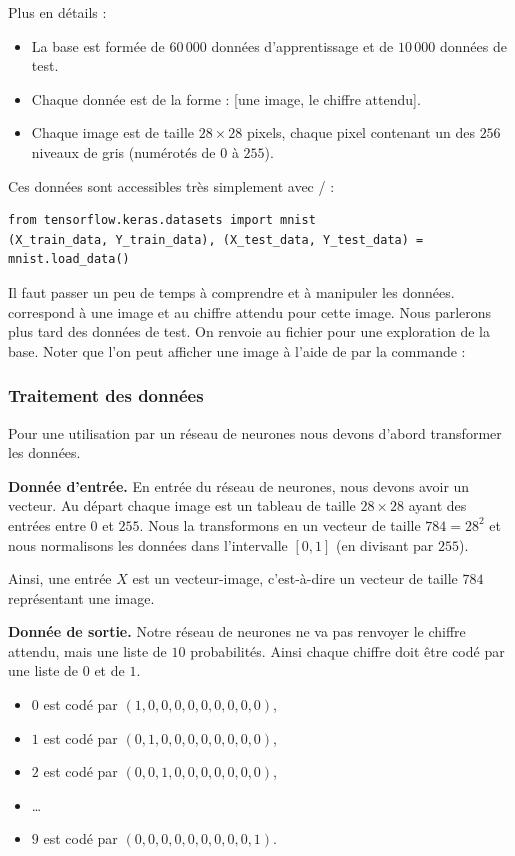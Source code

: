 \documentclass[11pt,class=report,crop=false]{standalone}
\begin{document}
Plus en détails :
\begin{itemize}
  \item La base est formée de $60\,000$ données d'apprentissage et de $10\,000$ données de test.
  \item Chaque donnée est de la forme : [une image, le chiffre attendu].
  \item Chaque image est de taille $28\times28$ pixels, chaque pixel contenant un des $256$ niveaux de gris (numérotés de $0$ à $255$).
\end{itemize}



Ces données sont accessibles très simplement avec \tensorflow/\keras{} :
\begin{lstlisting}
from tensorflow.keras.datasets import mnist
(X_train_data, Y_train_data), (X_test_data, Y_test_data) = mnist.load_data()
\end{lstlisting} 

Il faut passer un peu de temps à comprendre et à manipuler les données.
 correspond à une image et  au chiffre attendu pour cette image. Nous parlerons plus tard des données de test.
On renvoie au fichier  pour une exploration de la base. Noter que l'on peut afficher une image à l'aide de \matplotlib{} par la commande :


\subsubsection*{Traitement des données}

Pour une utilisation par un réseau de neurones nous devons d'abord transformer les données.

\bigskip

\textbf{Donnée d'entrée.} En entrée du réseau de neurones, nous devons avoir un vecteur.
Au départ chaque image est un tableau de taille $28\times 28$ ayant des entrées entre $0$ et $255$. Nous la transformons en un vecteur de taille $784 = 28^2$ et nous normalisons les données dans l'intervalle $[0,1]$ (en divisant par $255$). 


Ainsi, une entrée $X$ est un \og{}vecteur-image\fg{}, c'est-à-dire un vecteur de taille $784$ représentant une image.

\bigskip

\textbf{Donnée de sortie.} Notre réseau de neurones ne va pas renvoyer le chiffre attendu, mais une liste de $10$ probabilités. Ainsi chaque chiffre doit être codé par une liste de $0$ et de $1$.
\begin{itemize}
  \item $0$ est codé par $(1,0,0,0,0,0,0,0,0,0)$,
  \item $1$ est codé par $(0,1,0,0,0,0,0,0,0,0)$, 
  \item $2$ est codé par $(0,0,1,0,0,0,0,0,0,0)$, 
  \item \ldots
  \item $9$ est codé par $(0,0,0,0,0,0,0,0,0,1)$.
\end{itemize}
\end{document}
